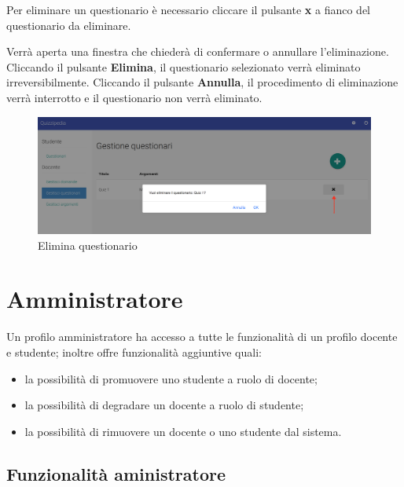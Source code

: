 \documentclass[12pt,a4paper]{article}
\begin{document}
		\par Per eliminare un questionario è necessario cliccare il pulsante \textbf{x} a fianco del questionario da eliminare. \\
		\par Verrà aperta una finestra che chiederà di confermare o annullare l'eliminazione. Cliccando il pulsante \textbf{Elimina}, il questionario selezionato verrà eliminato irreversibilmente. Cliccando il pulsante \textbf{Annulla}, il procedimento di eliminazione verrà interrotto e il questionario non verrà eliminato. \\
		
		\begin{figure}[H]	
			\centering
			\includegraphics[width=\linewidth]{../img/screenshot/eliminaQuestionario.png}
			\caption{Elimina questionario}
			\label{Elimina questionario}
		\end{figure}
		
		\section{Amministratore}
		\par Un profilo amministratore ha accesso a tutte le funzionalità di un profilo docente e studente; inoltre offre funzionalità aggiuntive quali: \\
		\begin{itemize}
			\item la possibilità di promuovere uno studente a ruolo di docente;
			\item la possibilità di degradare un docente a ruolo di studente;
			\item la possibilità di rimuovere un docente o uno studente dal sistema.
		\end{itemize}
		\subsection{Funzionalità aministratore}
		
\end{document}
